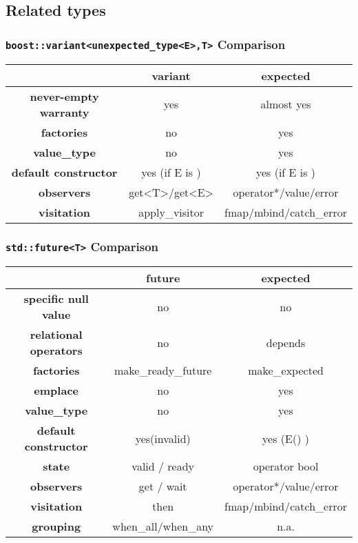 \documentclass[xcolor=dvipsnames]{beamer}
\newcommand{\cpp}[1]{\lstinline{#1}}
\begin{document}
\subsection{Related types}

\begin{frame}[fragile]
\frametitle{\cpp{boost::variant<unexpected_type<E>,T>} Comparison}

\begin{tabular}{|c|c|c|}
\hline
                    & \textbf{variant} & \textbf{expected}  \\
\hline
\textbf{never-empty warranty} & yes & almost yes \\
\hline
\textbf{factories} & no & yes  \\
\hline
\textbf{value\_type} & no & yes  \\
\hline
\textbf{default constructor} & yes (if E is ) & yes (if E is )  \\
\hline
\textbf{observers} & get<T>/get<E> & operator*/value/error   \\
\hline
\textbf{visitation} & apply\_visitor & fmap/mbind/catch\_error  \\
\hline
\end{tabular}
\end{frame}

\begin{frame}[fragile]
\frametitle{\cpp{std::future<T>} Comparison}

\begin{tabular}{|c|c|c|}
\hline
                    & \textbf{future} & \textbf{expected}  \\
\hline
\textbf{specific null value} & no & no \\
\hline
\textbf{relational operators} & no & depends \\
\hline
\textbf{factories} & make\_ready\_future & make\_expected  \\
\hline
\textbf{emplace} & no & yes \\
\hline
\textbf{value\_type} & no & yes  \\
\hline
\textbf{default constructor} & yes(invalid) & yes (E() )  \\
\hline
\textbf{state} & valid / ready & operator bool   \\
\hline
\textbf{observers} & get / wait & operator*/value/error   \\
\hline
\textbf{visitation} & then & fmap/mbind/catch\_error  \\
\hline
\textbf{grouping}  &  when\_all/when\_any &  n.a. \\
\hline
\end{tabular}
\end{frame}
\end{document}
